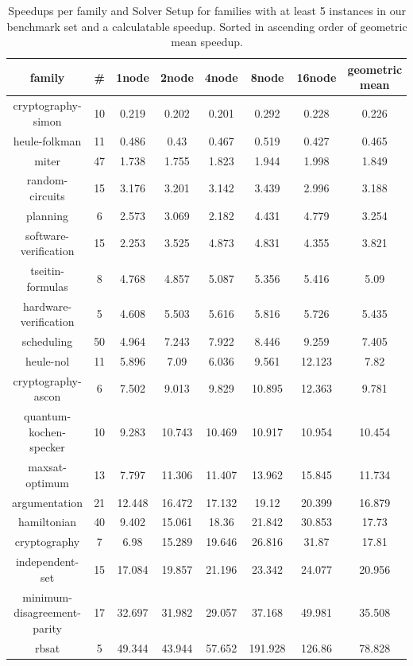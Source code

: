 \documentclass[12pt,a4paper,twoside]{scrartcl}
\numberwithin{equation}{section}
\begin{document}
\begin{table}
  \center
  \begin{tabular}{ c|c|c|c|c|c|c|c }
    family	&	\#	&	1node	&	2node	&	4node	&	8node	&	16node	&	geometric mean\\
    \hline
    cryptography-simon	&	10	&	0.219	&	0.202	&	0.201	&	0.292	&	0.228	&	0.226\\
    heule-folkman	&	11	&	0.486	&	0.43	&	0.467	&	0.519	&	0.427	&	0.465\\
    miter	&	47	&	1.738	&	1.755	&	1.823	&	1.944	&	1.998	&	1.849\\
    random-circuits	&	15	&	3.176	&	3.201	&	3.142	&	3.439	&	2.996	&	3.188\\
    planning	&	6	&	2.573	&	3.069	&	2.182	&	4.431	&	4.779	&	3.254\\
    software-verification	&	15	&	2.253	&	3.525	&	4.873	&	4.831	&	4.355	&	3.821\\
    tseitin-formulas	&	8	&	4.768	&	4.857	&	5.087	&	5.356	&	5.416	&	5.09\\
    hardware-verification	&	5	&	4.608	&	5.503	&	5.616	&	5.816	&	5.726	&	5.435\\
    scheduling	&	50	&	4.964	&	7.243	&	7.922	&	8.446	&	9.259	&	7.405\\
    heule-nol	&	11	&	5.896	&	7.09	&	6.036	&	9.561	&	12.123	&	7.82\\
    cryptography-ascon	&	6	&	7.502	&	9.013	&	9.829	&	10.895	&	12.363	&	9.781\\
    quantum-kochen-specker	&	10	&	9.283	&	10.743	&	10.469	&	10.917	&	10.954	&	10.454\\
    maxsat-optimum	&	13	&	7.797	&	11.306	&	11.407	&	13.962	&	15.845	&	11.734\\
    argumentation	&	21	&	12.448	&	16.472	&	17.132	&	19.12	&	20.399	&	16.879\\
    hamiltonian	&	40	&	9.402	&	15.061	&	18.36	&	21.842	&	30.853	&	17.73\\
    cryptography	&	7	&	6.98	&	15.289	&	19.646	&	26.816	&	31.87	&	17.81\\
    independent-set	&	15	&	17.084	&	19.857	&	21.196	&	23.342	&	24.077	&	20.956\\
    minimum-disagreement-parity	&	17	&	32.697	&	31.982	&	29.057	&	37.168	&	49.981	&	35.508\\
    rbsat	&	5	&	49.344	&	43.944	&	57.652	&	191.928	&	126.86	&	78.828\\
  \end{tabular}
  \caption{Speedups per family and Solver Setup for families with at least 5 instances in our benchmark set and a calculatable speedup. Sorted in ascending order of geometric mean speedup.}
  \label{tab:speedupsSignificantFamilies}
\end{table}
\end{document}
